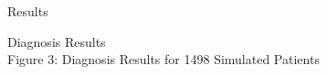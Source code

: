 \documentclass[final]{beamer} %
\begin{document}
\begin{frame}{}
\begin{columns}[T]
\begin{column}{0.3\linewidth}
\begin{block}{\Huge Results}
\begin{block}{\Large Diagnosis Results}
\centering
{}
   \\
   Figure 3: Diagnosis Results for 1498 Simulated Patients
      \end{block}
    \end{block}
    \end{column}
    \end{columns}
  \end{frame}
  
\end{document}
